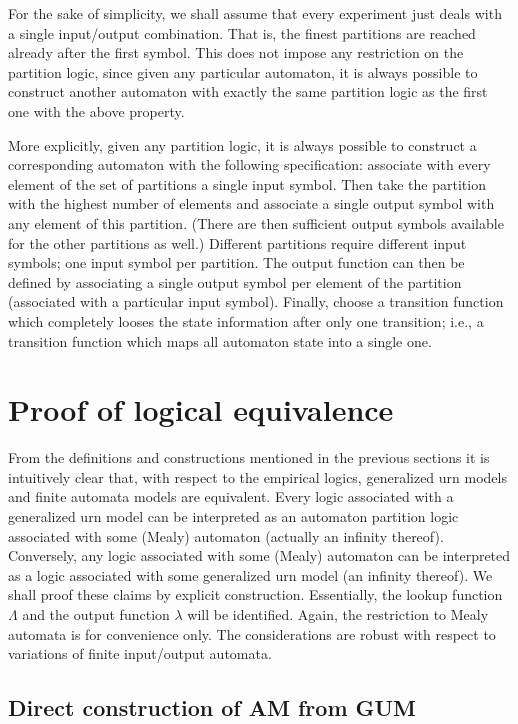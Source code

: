 For the sake of simplicity,
we shall assume that every experiment just deals with a single input/output
combination.
That is, the finest partitions are reached already after the first symbol.
This does not impose any restriction on the partition logic, since
given any particular automaton, it is always possible
to construct another automaton with exactly the same partition logic as the first one
with the above property.

More explicitly, given any partition logic, it is always possible to
construct a corresponding automaton with the following specification:
associate with every element of the set of partitions a single input symbol.
Then take the partition with the highest number of elements and associate a single output
symbol with any element of this partition.
(There are then sufficient output
symbols available for the other partitions as well.)
Different partitions require different input symbols;
one input symbol per partition.
The output function  can then be defined by associating a single output symbol per element
of the partition (associated with a particular input symbol).
Finally, choose a transition function which completely looses the state information
after only one transition; i.e., a transition function which maps all automaton state into
a single one.


\section{Proof of logical equivalence}

From the definitions and constructions mentioned in the previous sections
it is intuitively clear
that, with respect to the empirical logics,
generalized urn models and finite automata models
are equivalent.
Every logic associated with a generalized urn model
can be interpreted as an automaton partition logic
associated with some (Mealy) automaton (actually an infinity thereof).
Conversely, any logic associated with some (Mealy) automaton
can be interpreted as a logic associated with some generalized urn model
(an infinity thereof).
We shall proof these claims by explicit construction.
Essentially, the lookup function
$\Lambda$ and the output function $\lambda$ will be identified.
Again, the restriction to Mealy automata is for convenience only.
The considerations are robust with respect to variations of finite input/output automata.


\subsection{Direct construction of AM from GUM}


